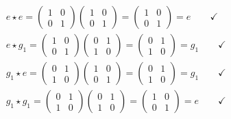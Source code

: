 \documentclass[12pt,epsf]{article}
\def\nolabel{\nonumber }
\def\nolabel{\nonumber }
\begin{document}
\begin{eqnarray}
& & e\star e = 
\begin{pmatrix}
1 & 0 \\ 0 & 1
\end{pmatrix}
\begin{pmatrix}
1 & 0 \\ 0 & 1
\end{pmatrix} = 
\begin{pmatrix}
1 & 0 \\ 0 & 1
\end{pmatrix} = e \qquad \checkmark \nolabel \\
& & e\star g_1 = 
\begin{pmatrix}
1 & 0 \\ 0 & 1
\end{pmatrix}
\begin{pmatrix}
0 & 1 \\ 1 & 0
\end{pmatrix} = 
\begin{pmatrix}
0 & 1 \\ 1 & 0
\end{pmatrix} = g_1 \qquad \checkmark \nolabel \\
& & g_1\star e = 
\begin{pmatrix}
0 & 1 \\ 1 & 0
\end{pmatrix}
\begin{pmatrix}
1 & 0 \\ 0 & 1
\end{pmatrix} = 
\begin{pmatrix}
0 & 1 \\ 1 & 0
\end{pmatrix} = g_1 \qquad \checkmark\nolabel  \\
& & g_1\star g_1 = 
\begin{pmatrix}
0 & 1 \\ 1 & 0
\end{pmatrix}
\begin{pmatrix}
0 & 1 \\ 1 & 0
\end{pmatrix} = 
\begin{pmatrix}
1 & 0 \\ 0 & 1
\end{pmatrix} = e \qquad \checkmark \nolabel 
\end{eqnarray}
\end{document}
